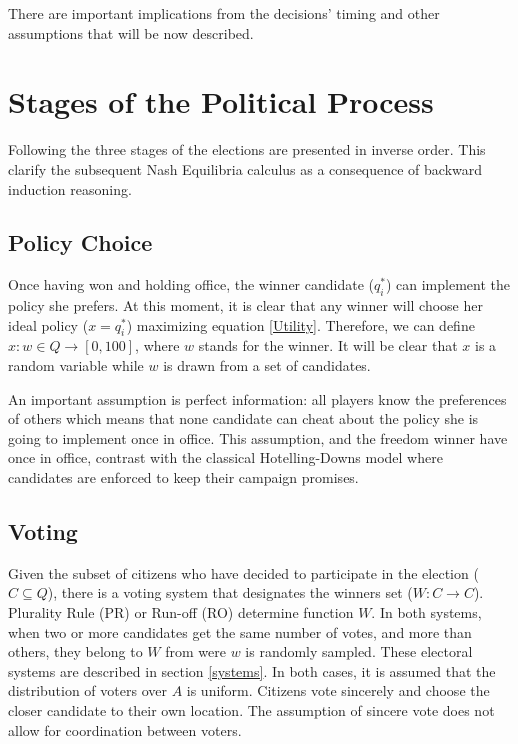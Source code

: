 There are important implications from the decisions' timing and other assumptions that will be now described.

\section{Stages of the Political Process}

Following  the three stages of the elections are presented in inverse order.
This clarify the subsequent Nash Equilibria calculus as a consequence of backward induction reasoning.

	\subsection{Policy Choice}
	Once having won and holding office, the winner candidate ($q_i^*$) can implement the policy she prefers. 
	At this moment, it is clear that any winner will choose her ideal policy ($x=q_i^*$) maximizing equation \ref{Utility}. Therefore, we can define $x: w \in Q \rightarrow [0,100]$, where $w$ stands for the winner. It will be clear that $x$ is a random variable while $w$ is drawn from a set of candidates.
	
	An important assumption is perfect information: all players know the preferences of others which means that none candidate can cheat about the policy she is going to implement once in office.
	This assumption, and the freedom winner have once in office, contrast with the classical Hotelling-Downs model where candidates are enforced to keep their campaign promises.
	
	\subsection{Voting}
	Given the subset of citizens who have decided to participate in the election ($C \subseteq Q$),
	there is a voting system that designates the winners set ($W: C \rightarrow C$). 
	Plurality Rule (PR) or Run-off (RO) determine function $W$. In both systems, when two or more candidates get the same number of votes, and more than others, they belong to $W$ from were $w$ is randomly sampled.
	These electoral systems are described in section \ref{systems}.
	In both cases, it is assumed that the distribution of voters over $A$ is uniform. Citizens vote sincerely and choose the closer candidate to their own location.  
	The assumption of sincere vote does not allow for coordination between voters. %
	
